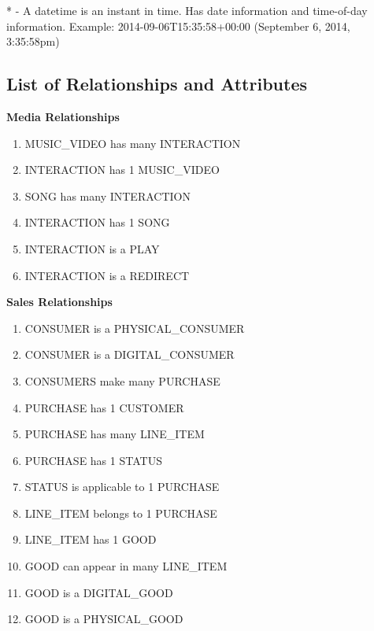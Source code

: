 \documentclass[11pt, a4paper]{report}
\begin{document}
* - A datetime is an instant in time. Has date information and time-of-day information. Example: 2014-09-06T15:35:58+00:00 (September 6, 2014, 3:35:58pm)

\clearpage
\subsection{List of Relationships and Attributes}

\noindent\textbf{Media Relationships}
\begin{enumerate}
\item MUSIC\_VIDEO has many INTERACTION
\item INTERACTION has 1 MUSIC\_VIDEO
\item SONG has many INTERACTION
\item INTERACTION has 1 SONG
\item INTERACTION is a PLAY
\item INTERACTION is a REDIRECT
\end{enumerate}

\noindent\textbf{Sales Relationships}
\begin{enumerate}
\item CONSUMER is a PHYSICAL\_CONSUMER
\item CONSUMER is a DIGITAL\_CONSUMER
\item CONSUMERS make many PURCHASE
\item PURCHASE has 1 CUSTOMER
\item PURCHASE has many LINE\_ITEM
\item PURCHASE has 1 STATUS
\item STATUS is applicable to 1 PURCHASE
\item LINE\_ITEM belongs to 1 PURCHASE
\item LINE\_ITEM has 1 GOOD
\item GOOD can appear in many LINE\_ITEM
\item GOOD is a DIGITAL\_GOOD
\item GOOD is a PHYSICAL\_GOOD
\end{enumerate}

\clearpage
\end{document}
